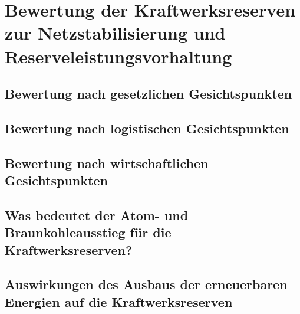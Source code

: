 \section{Bewertung der Kraftwerksreserven zur Netzstabilisierung und Reserveleistungsvorhaltung}

	\subsection{Bewertung nach gesetzlichen Gesichtspunkten}
	
	
	
	\subsection{Bewertung nach logistischen Gesichtspunkten}
	
	
	
	\subsection{Bewertung nach wirtschaftlichen Gesichtspunkten}
	
	
	
	\subsection{Was bedeutet der Atom- und Braunkohleausstieg für die Kraftwerksreserven?}
	
	
		
	\subsection{Auswirkungen des Ausbaus der erneuerbaren Energien auf die Kraftwerksreserven}